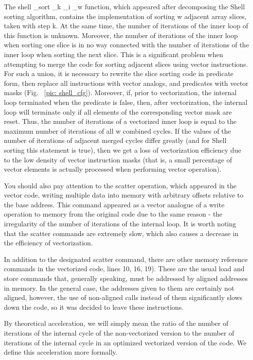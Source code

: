 \documentclass[
11pt,%
tightenlines,%
twoside,%
onecolumn,%
nofloats,%
nobibnotes,%
nofootinbib,%
superscriptaddress,%
noshowpacs,%
centertags]%
{revtex4}
\begin{document}
The shell  \_sort \_k \_i \_w  function, which appeared after decomposing the Shell sorting algorithm, contains the implementation of sorting w adjacent array slices, taken with step k. At the same time, the number of iterations of the inner loop of this function is unknown. Moreover, the number of iterations of the inner loop when sorting one slice is in no way connected with the number of iterations of the inner loop when sorting the next slice. This is a significant problem when attempting to merge the code for sorting adjacent slices using vector instructions. For such a union, it is necessary to rewrite the slice sorting code in predicate form, then replace all instructions with vector analogs, and predicates with vector masks (Fig. ~\ref {pic: shell_cfg}). Moreover, if, prior to vectorization, the internal loop terminated when the predicate is false, then, after vectorization, the internal loop will terminate only if all elements of the corresponding vector mask are reset. Thus, the number of iterations of a vectorized inner loop is equal to the maximum number of iterations of all w combined cycles. If the values ​​of the number of iterations of adjacent merged cycles differ greatly (and for Shell sorting this statement is true), then we get a loss of vectorization efficiency due to the low density of vector instruction masks (that is, a small percentage of vector elements is actually processed when performing vector operation).

You should also pay attention to the scatter operation, which appeared in the vector code, writing multiple data into memory with arbitrary offsets relative to the base address. This command appeared as a vector analogue of a write operation to memory from the original code due to the same reason - the irregularity of the number of iterations of the internal loop. It is worth noting that the scatter commands are extremely slow, which also causes a decrease in the efficiency of vectorization.

In addition to the designated scatter command, there are other memory reference commands in the vectorized code, lines 10, 16, 19). These are the usual load and store commands that, generally speaking, must be addressed by aligned addresses in memory. In the general case, the addresses given to them are certainly not aligned, however, the use of non-aligned calls instead of them significantly slows down the code, so it was decided to leave these instructions.

By theoretical acceleration, we will simply mean the ratio of the number of iterations of the internal cycle of the non-vectorized version to the number of iterations of the internal cycle in an optimized vectorized version of the code. We define this acceleration more formally.
\end{document}
